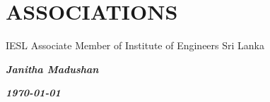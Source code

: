 \documentclass[]{cv-class}
\begin{document}
\section{ASSOCIATIONS}
\begin{entrylist}
\entry
    {}
	{IESL}    
    {}
	{Associate Member of Institute of Engineers Sri Lanka}
\end{entrylist}

\begin{flushright}
\emph{\textbf{Janitha Madushan}}
\end{flushright}
\begin{flushright}
\emph{\textbf{\today}}
\end{flushright}
\end{document}
